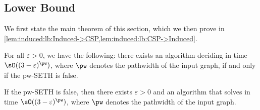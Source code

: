 \subsection{Lower Bound}\label{subsec:induced:lb}

We first state the main theorem of this section,
which we then prove in \cref{lem:induced:lb:Induced->CSP,lem:induced:lb:CSP->Induced}.

\begin{theorem}\label{thm:induced:lb}
    For all $\varepsilon > 0$, we have the following:
    there exists an algorithm deciding {\InducedM} in time $\sO((3-\varepsilon)^\pw)$,
    where $\pw$ denotes the pathwidth of the input graph,
    if and only if the pw-SETH is false.
\end{theorem}


\begin{lemmarep}[\appsymb]\label{lem:induced:lb:Induced->CSP}
    If the pw-SETH is false,
    then there exists $\varepsilon > 0$
    and an algorithm that solves {\InducedM} in time $\sO((3-\varepsilon)^\pw)$,
    where $\pw$ denotes the pathwidth of the input graph.
\end{lemmarep}


